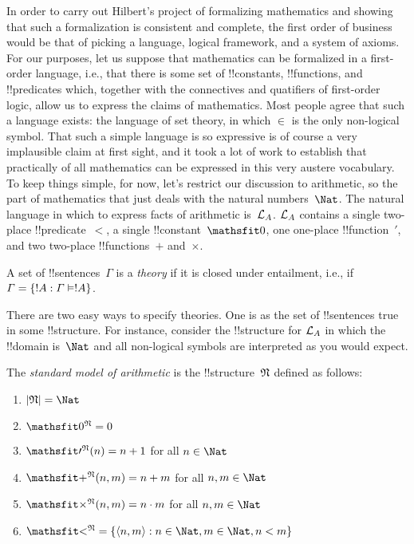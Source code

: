 \documentclass[../../../include/open-logic-section]{subfiles}
\begin{document}


In order to carry out Hilbert's project of formalizing mathematics and
showing that such a formalization is consistent and complete, the
first order of business would be that of picking a language, logical
framework, and a system of axioms.  For our purposes, let us suppose
that mathematics can be formalized in a first-order language, i.e.,
that there is some set of !!{constant}s, !!{function}s, and
!!{predicate}s which, together with the connectives and quatifiers of
first-order logic, allow us to express the claims of mathematics.
Most people agree that such a language exists: the language of set
theory, in which $\in$ is the only non-logical symbol.  That such a
simple language is so expressive is of course a very implausible claim
at first sight, and it took a lot of work to establish that
practically of all mathematics can be expressed in this very austere
vocabulary.  To keep things simple, for now, let's restrict our
discussion to arithmetic, so the part of mathematics that just deals
with the natural numbers~$\Nat$.  The natural language in which to
express facts of arithmetic is~$\Lang L_A$. $\Lang L_A$ contains a
single two-place !!{predicate}~$<$, a single !!{constant}~$\Obj 0$,
one one-place !!{function}~$\prime$, and two two-place
!!{function}s~$+$ and~$\times$.

\begin{defn}
A set of !!{sentence}s~$\Gamma$ is a \emph{theory} if it is closed
under entailment, i.e., if $\Gamma = \Setabs{!A}{\Gamma \Entails
!A}$.
\end{defn}

There are two easy ways to specify theories. One is as the set of
!!{sentence}s true in some !!{structure}.  For instance, consider the
!!{structure} for $\Lang L_A$ in which the !!{domain} is~$\Nat$ and
all non-logical symbols are interpreted as you would expect.

\begin{defn}
The \emph{standard model of arithmetic} is the !!{structure}~$\Struct
N$ defined as follows:
\begin{enumerate}
\item $\Domain N = \Nat$
\item $\Assign{\Obj 0}{N} = 0$
\item $\Assign{\Obj \prime}{N}(n) = n + 1$ for all $n \in \Nat$
\item $\Assign{\Obj +}{N}(n, m) = n + m$ for all $n, m \in \Nat$
\item $\Assign{\Obj \times}{N}(n, m) = n\cdot m$ for all $n, m \in \Nat$
\item $\Assign{\Obj <}{N} = \Setabs{\tuple{n, m}}{n \in \Nat, m \in
  \Nat, n < m}$
\end{enumerate}
\end{defn}
\end{document}
